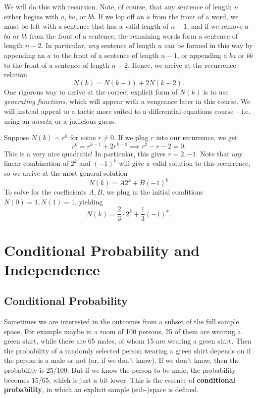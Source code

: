 \documentclass[../main.tex]{subfiles}
\begin{document}
\begin{solution}
We will do this with recursion. Note, of course, that any sentence of length $n$ either begins with $a$, $ba$, or $bb$. If we lop off an $a$ from the front of a word, we must be left with a sentence that has a valid length of $n-1$, and if we remove a $ba$ or $bb$ from the front of a sentence, the remaining words form a sentence of length $n-2$. In particular, \textit{any} sentence of length $n$ can be formed in this way by appending an $a$ to the front of a sentence of length $n-1$, or appending a $ba$ or $bb$ to the front of a sentence of length $n-2$. Hence, we arrive at the recurrence relation
\[
	N(k) = N(k-1) + 2N(k-2).
\]
One rigorous way to arrive at the correct explicit form of $N(k)$ is to use \textit{generating functions}, which will appear with a vengeance later in this course. We will instead appeal to a tactic more suited to a differential equations course -- i.e. using an \textit{ansatz}, or a judicious guess. 

Suppose $N(k) = r^k$ for some $r \neq 0$. If we plug $r$ into our recurrence, we get 
\[
	r^k = r^{k-1} + 2r^{k-2} \implies r^2 - r - 2 = 0.
\]
This is a very nice quadratic! In particular, this gives $r = 2, -1$. Note that any linear combination of $2^k$ and $(-1)^k$ will give a valid solution to this recurrence, so we arrive at the most general solution 
\[
	N(k) = A2^k + B(-1)^k 
\]
To solve for the coefficients $A, B$, we plug in the initial conditions $N(0) = 1, N(1) = 1$, yielding
\[
	N(k) = \frac{2}{3} \cdot 2^k + \frac{1}{3} (-1)^k.
\]
\end{solution}

\section{Conditional Probability and Independence}
\subsection{Conditional Probability}
Sometimes we are interested in the outcomes from a subset of the full sample space. 
For example maybe in a room of 100 persons, 25 of them are wearing a green shirt, while there are 65 males, of whom 15 are wearing a green shirt. Then the probability of a
randomly selected person wearing a green shirt depends on if the person is a male or not (or, if we don't know). If we don't know, then the probability is 25/100. But if
we know the person to be male, the probability becomes 15/65, which is just a bit lower.
This is the essence of \textbf{conditional probability}, in which an explicit sample (sub-)space is defined.
\end{document}
